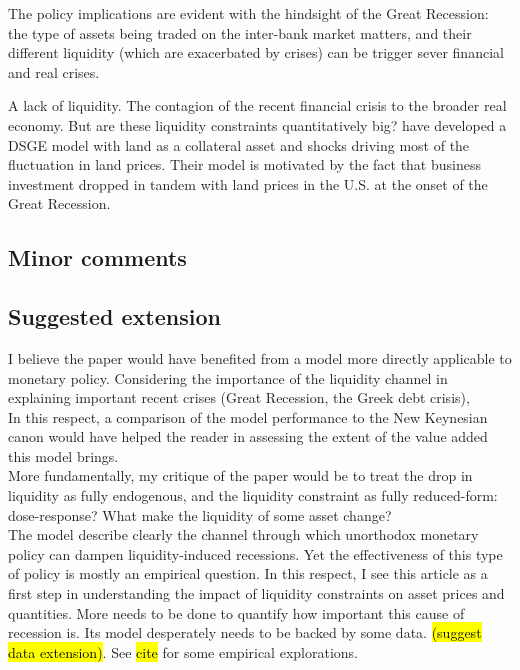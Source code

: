 \documentclass{amsart}
\theoremstyle{definition}
\theoremstyle{remark}
\numberwithin{equation}{section}
\begin{document}
The policy implications are evident with the hindsight of the Great Recession: the type of assets being traded on the inter-bank market matters, and their different liquidity (which are exacerbated by crises) can be trigger sever financial and real crises.

A lack of liquidity. The contagion of the recent financial crisis to the broader real economy. But are these liquidity constraints quantitatively big? \cite{liu2013land} have developed a DSGE model with land as a collateral asset and shocks driving most of the fluctuation in land prices. Their model is motivated by the fact that business investment dropped in tandem with land prices in the U.S. at the onset of the Great Recession.

\subsection*{Minor comments}

\subsection*{Suggested extension}

I believe the paper would have benefited from a model more directly applicable to monetary policy. Considering the importance of the liquidity channel in explaining important recent crises (Great Recession, the Greek debt crisis), \\

In this respect, a comparison of the model performance to the New Keynesian canon \citep{gali2015monetary} would have helped the reader in assessing the extent of the value added this model brings.\\

More fundamentally, my critique of the paper would be to treat the drop in liquidity as fully endogenous, and the liquidity constraint as fully reduced-form: dose-response? What make the liquidity of some asset change?\\

The model describe clearly the channel through which unorthodox monetary policy can dampen liquidity-induced recessions. Yet the effectiveness of this type of policy is mostly an empirical question. In this respect, I see this article as a first step in understanding the impact of liquidity constraints on asset prices and quantities. More needs to be done to quantify how important this cause of recession is. Its model desperately needs to be backed by some data. \hl{(suggest data extension)}. See \hl{cite} for some empirical explorations.\\
\end{document}
